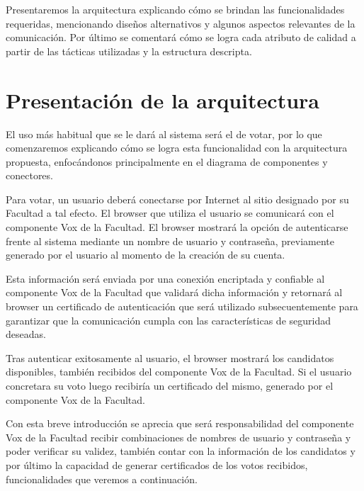 

Presentaremos la arquitectura explicando cómo se brindan las funcionalidades requeridas, mencionando diseños alternativos y algunos aspectos relevantes de la comunicación. Por último se comentará cómo se logra cada atributo de calidad a partir de las tácticas utilizadas y la estructura descripta. 

\section{Presentación de la arquitectura}

El uso más habitual que se le dará al sistema será el de votar, por lo que comenzaremos explicando cómo se logra esta funcionalidad con la arquitectura propuesta, enfocándonos principalmente en el diagrama de componentes y conectores.

Para votar, un usuario deberá conectarse por Internet al sitio designado por su Facultad a tal efecto. El browser que utiliza el usuario se comunicará con el componente Vox de la Facultad. El browser mostrará la opción de autenticarse frente al sistema mediante un nombre de usuario y contraseña, previamente generado por el usuario al momento de la creación de su cuenta.

Esta información será enviada por una conexión encriptada y confiable al componente Vox de la Facultad que validará dicha información y retornará al browser un certificado de autenticación que será utilizado subsecuentemente para garantizar que la comunicación cumpla con las características de seguridad deseadas.

Tras autenticar exitosamente al usuario, el browser mostrará los candidatos disponibles, también recibidos del componente Vox de la Facultad. Si el usuario concretara su voto luego recibiría un certificado del mismo, generado por el componente Vox de la Facultad.

Con esta breve introducción se aprecia que será responsabilidad del componente Vox de la Facultad recibir combinaciones de nombres de usuario y contraseña y poder verificar su validez, también contar con la información de los candidatos y por último la capacidad de generar certificados de los votos recibidos, funcionalidades que veremos a continuación.


